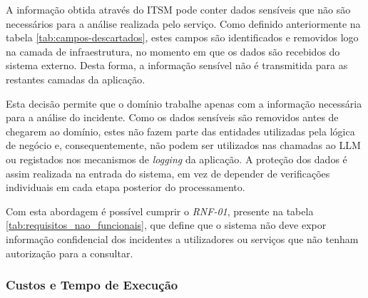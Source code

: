 
			A informação obtida através do \gls{ITSM} pode conter dados sensíveis que não são necessários para a análise realizada pelo serviço. Como definido anteriormente na tabela \ref{tab:campos-descartados}, estes campos são identificados e removidos logo na camada de infraestrutura, no momento em que os dados são recebidos do sistema externo. Desta forma, a informação sensível não é transmitida para as restantes camadas da aplicação.
			
			Esta decisão permite que o domínio trabalhe apenas com a informação necessária para a análise do incidente. Como os dados sensíveis são removidos antes de chegarem ao domínio, estes não fazem parte das entidades utilizadas pela lógica de negócio e, consequentemente, não podem ser utilizados nas chamadas ao \gls{LLM} ou registados nos mecanismos de \textit{logging} da aplicação. A proteção dos dados é assim realizada na entrada do sistema, em vez de depender de verificações individuais em cada etapa posterior do processamento.
			
			Com esta abordagem é possível cumprir o \textit{RNF-01}, presente na tabela \ref{tab:requisitos_nao_funcionais}, que define que o sistema não deve expor informação confidencial dos incidentes a utilizadores ou serviços que não tenham autorização para a consultar.
			
		\subsubsection{Custos e Tempo de Execução}
			
			
			
			
